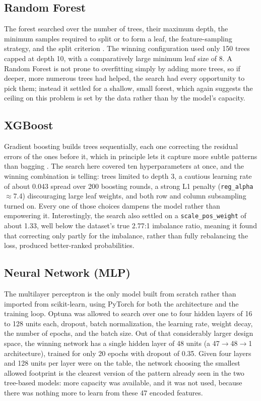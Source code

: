 \documentclass{article}
\begin{document}
\subsection{Random Forest}
The forest searched over the number of trees, their maximum depth, the minimum samples required to split or to form a leaf, the feature-sampling strategy, and the split criterion \cite{breiman2001randomforests}. The winning configuration used only 150 trees capped at depth 10, with a comparatively large minimum leaf size of 8. A Random Forest is not prone to overfitting simply by adding more trees, so if deeper, more numerous trees had helped, the search had every opportunity to pick them; instead it settled for a shallow, small forest, which again suggests the ceiling on this problem is set by the data rather than by the model's capacity.

\subsection{XGBoost}
Gradient boosting builds trees sequentially, each one correcting the residual errors of the ones before it, which in principle lets it capture more subtle patterns than bagging \cite{chen2016xgboost}. The search here covered ten hyperparameters at once, and the winning combination is telling: trees limited to depth 3, a cautious learning rate of about 0.043 spread over 200 boosting rounds, a strong L1 penalty (\texttt{reg\_alpha}$\approx$7.4) discouraging large leaf weights, and both row and column subsampling turned on. Every one of those choices dampens the model rather than empowering it. Interestingly, the search also settled on a \texttt{scale\_pos\_weight} of about 1.33, well below the dataset's true 2.77:1 imbalance ratio, meaning it found that correcting only partly for the imbalance, rather than fully rebalancing the loss, produced better-ranked probabilities.

\subsection{Neural Network (MLP)}
The multilayer perceptron is the only model built from scratch rather than imported from scikit-learn, using PyTorch \cite{paszke2019pytorch} for both the architecture and the training loop. Optuna was allowed to search over one to four hidden layers of 16 to 128 units each, dropout, batch normalization, the learning rate, weight decay, the number of epochs, and the batch size. Out of that considerably larger design space, the winning network has a single hidden layer of 48 units (a 47$\rightarrow$48$\rightarrow$1 architecture), trained for only 20 epochs with dropout of 0.35. Given four layers and 128 units per layer were on the table, the network choosing the smallest allowed footprint is the clearest version of the pattern already seen in the two tree-based models: more capacity was available, and it was not used, because there was nothing more to learn from these 47 encoded features.
\end{document}
